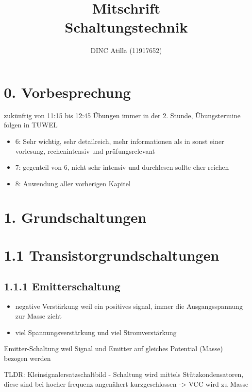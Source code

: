 \documentclass[a4paper]{article}
\title{Mitschrift\\Schaltungstechnik}
\author{DINC Atilla (11917652)}
\begin{document}
\normalsize
\maketitle


\section*{0. Vorbesprechung}

zukünftig von 11:15 bis 12:45\newline
Übungen immer in der 2. Stunde, Übungstermine folgen in TUWEL

\begin{itemize}
    \item 6: Sehr wichtig, sehr detailreich, mehr informationen als in sonst einer vorlesung, rechenintensiv und prüfungsrelevant
    \item 7: gegenteil von 6, nicht sehr intensiv und durchlesen sollte eher reichen
    \item 8: Anwendung aller vorherigen Kapitel
\end{itemize}

\section*{1. Grundschaltungen}
\section*{1.1 Transistorgrundschaltungen}
\subsection*{1.1.1 Emitterschaltung}
\begin{itemize}
    \item negative Verstärkung weil ein positives signal, immer die Ausgangsspannung zur Masse zieht
    \item viel Spannungsverstärkung und viel Stromverstärkung
\end{itemize}

Emitter-Schaltung weil Signal und Emitter auf gleiches Potential (Masse) bezogen werden

TLDR: Kleinsignalersatzschaltbild - Schaltung wird mittels Stützkondensatoren,
diese sind bei hocher frequenz angenähert kurzgeschlossen -> VCC wird zu Masse
\end{document}
